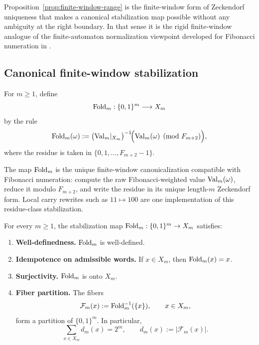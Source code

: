 \begin{remark}
Proposition~\ref{prop:finite-window-range} is the finite-window form of Zeckendorf uniqueness that makes a canonical stabilization map possible without any ambiguity at the right boundary. In that sense it is the rigid finite-window analogue of the finite-automaton normalization viewpoint developed for Fibonacci numeration in \cite{Frougny1992,Berstel2001}.
\end{remark}

\subsection{Canonical finite-window stabilization}\label{sec:stab:fold}

\begin{definition}\label{def:fold}
For $m\ge 1$, define
\[
\mathrm{Fold}_m:\{0,1\}^m\longrightarrow X_m
\]
by the rule
\[
\mathrm{Fold}_m(\omega)
:=
\bigl(\mathrm{Val}_m|_{X_m}\bigr)^{-1}\!\Bigl(\mathrm{Val}_m(\omega)\pmod{F_{m+2}}\Bigr),
\]
where the residue is taken in $\{0,1,\dots,F_{m+2}-1\}$.
\end{definition}

\begin{remark}
The map $\mathrm{Fold}_m$ is the unique finite-window canonicalization compatible with Fibonacci numeration: compute the raw Fibonacci-weighted value $\mathrm{Val}_m(\omega)$, reduce it modulo $F_{m+2}$, and write the residue in its unique length-$m$ Zeckendorf form. Local carry rewrites such as $11\mapsto 100$ are one implementation of this residue-class stabilization.
\end{remark}

\begin{theorem}\label{thm:fold-suite}
For every $m\ge 1$, the stabilization map $\mathrm{Fold}_m:\{0,1\}^m\to X_m$ satisfies:
\begin{enumerate}[label=(\roman*),leftmargin=*,itemsep=2pt]
  \item \textbf{Well-definedness.} $\mathrm{Fold}_m$ is well-defined.
  \item \textbf{Idempotence on admissible words.} If $x\in X_m$, then $\mathrm{Fold}_m(x)=x$.
  \item \textbf{Surjectivity.} $\mathrm{Fold}_m$ is onto $X_m$.
  \item \textbf{Fiber partition.} The fibers
  \[
  \mathcal{F}_m(x):=\mathrm{Fold}_m^{-1}(\{x\}),\qquad x\in X_m,
  \]
  form a partition of $\{0,1\}^m$. In particular,
  \[
  \sum_{x\in X_m} d_m(x)=2^m,
  \qquad
  d_m(x):=|\mathcal{F}_m(x)|.
  \]
\end{enumerate}
\end{theorem}

